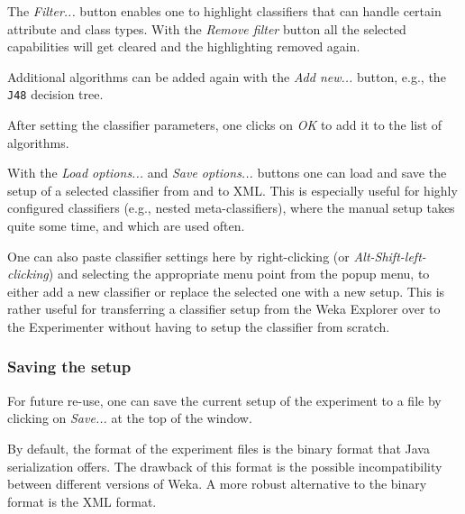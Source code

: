 The \textit{Filter...} button enables one to highlight classifiers that can handle certain attribute and class types. With the \textit{Remove filter} button all the selected capabilities will get cleared and the highlighting removed again.

Additional algorithms can be added again with the \textit{Add new...} button, e.g., the \texttt{J48} decision tree.

\begin{center}
\end{center}


After setting the classifier parameters, one clicks on \textit{OK} to add it to the list of algorithms.

\begin{center}
\end{center}


With the \textit{Load options...} and \textit{Save options...} buttons one can load and save the setup of a selected classifier from and to XML. This is especially useful for highly configured classifiers (e.g., nested meta-classifiers), where the manual setup takes quite some time, and which are used often.

One can also paste classifier settings here by right-clicking (or \textit{Alt-Shift-left-clicking}) and selecting the appropriate menu point from the popup menu, to either add a new classifier or replace the selected one with a new setup. This is rather useful for transferring a classifier setup from the Weka Explorer over to the Experimenter without having to setup the classifier from scratch.

\subsubsection{Saving the setup}

For future re-use, one can save the current setup of the experiment to a file by clicking on \textit{Save...} at the top of the window.

\begin{center}
\end{center}


By default, the format of the experiment files is the binary format that Java serialization offers. The drawback of this format is the possible incompatibility between different versions of Weka. A more robust alternative to the binary format is the XML format.

